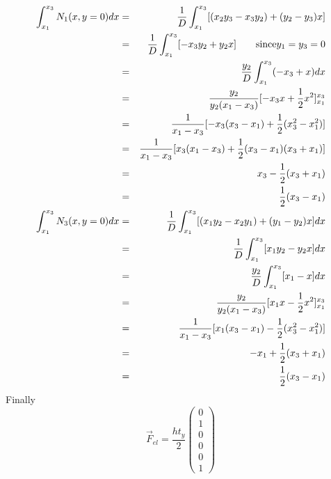 \begin{eqnarray}
\int_{x_1}^{x_3} N_1(x,y=0) dx 
&=& \frac{1}{D} \int_{x_1}^{x_3} [(x_2y_3-x_3y_2) + (y_2-y_3)x ] \nonumber\\
&=& \frac{1}{D} \int_{x_1}^{x_3} [-x_3y_2 + y_2 x ] \qquad \text{since} y_1=y_3=0 \nonumber\\
&=& \frac{y_2}{D} \int_{x_1}^{x_3} (-x_3 +  x ) dx \nonumber\\
&=& \frac{y_2}{y_2(x_1-x_3)  } [ -x_3 x + \frac{1}{2}x^2]_{x_1}^{x_3} \nonumber\\ 
&=& \frac{1}{x_1-x_3 } [ -x_3 (x_3-x_1) + \frac{1}{2}(x_3^2-x_1^2)] \nonumber\\
&=& \frac{1}{x_1-x_3 } [ x_3 (x_1-x_3) + \frac{1}{2}(x_3-x_1)(x_3+x_1)] \nonumber\\
&=&  x_3 - \frac{1}{2}(x_3+x_1) \nonumber\\
&=&  \frac{1}{2} (x_3-x_1) \\
\int_{x_1}^{x_3} N_3(x,y=0) dx
&=& \frac{1}{D} \int_{x_1}^{x_3}    [(x_1y_2-x_2y_1) + (y_1-y_2)x ] dx \nonumber\\
&=& \frac{1}{D} \int_{x_1}^{x_3}    [x_1y_2 - y_2x ] dx \nonumber\\
&=& \frac{y_2}{D} \int_{x_1}^{x_3}    [x_1 - x ] dx \nonumber\\
&=& \frac{y_2}{y_2(x_1-x_3) } [x_1 x - \frac{1}{2} x^2]_{x_1}^{x_3}  \nonumber\\
&=& \frac{1}{x_1-x_3} [x_1 (x_3-x_1) - \frac{1}{2} (x_3^2-x_1^2)] \nonumber\\
&=& -x_1  + \frac{1}{2} (x_3+ x_1) \nonumber\\
&=& \frac{1}{2}( x_3 -x_1 )
\end{eqnarray}
Finally
\[
\vec{F}_{el}=
\frac{h t_y}{2}
\left(
\begin{array}{c}
0\\
1 \\
0\\
0\\
0\\
1 
\end{array}
\right)
\]





